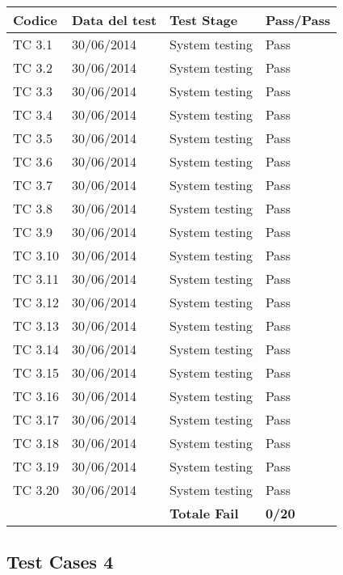 \begin{tabular}{|p{3cm}|p{3cm}|p{3cm}|p{3cm}|}
	\hline
	\rowcolor{Gray}
	\textbf{Codice} & \textbf{Data del test} & \textbf{Test Stage} & \textbf{Pass/Pass}\tabularnewline
	\hline
	TC 3.1			& 30/06/2014 			& System testing		& Pass \tabularnewline
	\hline
	TC 3.2			& 30/06/2014 			& System testing		& Pass \tabularnewline
	\hline
	TC 3.3			& 30/06/2014 			& System testing		& Pass \tabularnewline
	\hline
	TC 3.4			& 30/06/2014 			& System testing		& Pass \tabularnewline
	\hline
	TC 3.5			& 30/06/2014 			& System testing		& Pass \tabularnewline
	\hline
	TC 3.6			& 30/06/2014 			& System testing		& Pass \tabularnewline
	\hline
	TC 3.7			& 30/06/2014 			& System testing		& Pass \tabularnewline
	\hline
	TC 3.8			& 30/06/2014 			& System testing		& Pass \tabularnewline
	\hline
	TC 3.9			& 30/06/2014 			& System testing		& Pass \tabularnewline
	\hline
	TC 3.10			& 30/06/2014 			& System testing		& Pass \tabularnewline
	\hline
	TC 3.11			& 30/06/2014 			& System testing		& Pass \tabularnewline
	\hline
	TC 3.12			& 30/06/2014 			& System testing		& Pass \tabularnewline
	\hline
	TC 3.13			& 30/06/2014 			& System testing		& Pass \tabularnewline
	\hline
	TC 3.14			& 30/06/2014 			& System testing		& Pass \tabularnewline
	\hline
	TC 3.15			& 30/06/2014 			& System testing		& Pass \tabularnewline
	\hline
	TC 3.16			& 30/06/2014 			& System testing		& Pass \tabularnewline
	\hline
	TC 3.17			& 30/06/2014 			& System testing		& Pass \tabularnewline
	\hline
	TC 3.18			& 30/06/2014 			& System testing		& Pass \tabularnewline
	\hline
	TC 3.19			& 30/06/2014 			& System testing		& Pass \tabularnewline
	\hline
	TC 3.20			& 30/06/2014 			& System testing		& Pass \tabularnewline
	\hline
					& 						& \textbf{Totale Fail}	& \textbf{0/20} \tabularnewline
	\hline
\end{tabular}

\subsection{Test Cases 4}

